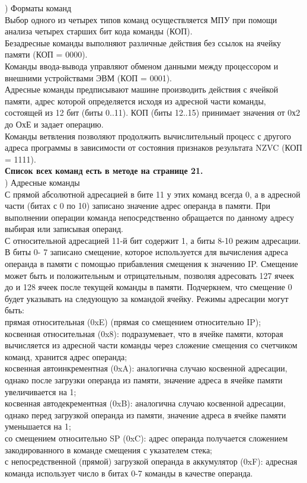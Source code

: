 ) Форматы команд \\
Выбор одного из четырех типов команд осуществляется МПУ при помощи анализа четырех старших бит кода команды (КОП). \\
Безадресные команды выполняют различные действия без ссылок на ячейку памяти (КОП = 0000). \\
Команды ввода-вывода управляют обменом данными между процессором и внешними устройствами ЭВМ (КОП = 0001). \\
Адресные команды предписывают машине производить действия с ячейкой памяти, адрес которой определяется исходя из адресной части команды, состоящей из 12 бит (биты 0..11). КОП (биты 12..15) принимает значения от 0х2 до ОхЕ и задает
операцию. \\
Команды ветвления позволяют продолжить вычислительный процесс с другого адреса программы в зависимости от состояния признаков результата NZVC (КОП = 1111). \\
\textbf{Список всех команд есть в методе на странице 21.} \\

) Адресные команды \\
С прямой абсолютной адресацией в бите 11 у этих команд всегда 0, а в адресной части (битах с 0 по 10) записано значение адрес операнда в памяти. При выполнении операции команда непосредственно обращается по данному адресу выбирая или записывая операнд. \\
С относительной адресацией 11-й бит содержит 1, а биты 8-10 режим адресации. В биты 0- 7 записано смещение, которое используется для вычисления адреса операнда в памяти с помощью прибавления смещения к значению IP. Смещение может быть и положительным и отрицательным, позволяя адресовать 127 ячеек до и 128 ячеек после текущей команды в памяти. Подчеркнем, что смещение 0 будет указывать на следующую за командой ячейку. Режимы адресации могут быть: \\
прямая относительная (0xE) (прямая со смещением относительно IP); \\
косвенная относительная (0x8): подразумевает, что в
ячейке памяти, которая вычисляется из адресной части команды через сложение смещения со счетчиком команд, хранится адрес операнда; \\
косвенная автоинкрементная (0xA): аналогична случаю
косвенной адресации, однако после загрузки операнда из памяти, значение адреса в ячейке памяти увеличивается на 1; \\
косвенная автодекрементная (0xB): аналогична случаю
косвенной адресации, однако перед загрузкой операнда из памяти, значение адреса в ячейке памяти уменьшается на 1; \\
со смещением относительно SP (0xC): адрес операнда получается сложением закодированного в команде смещения с указателем стека; \\
с непосредственной (прямой) загрузкой операнда в аккумулятор (0xF): адресная команда использует число в битах 0-7 команды в качестве операнда. \\

